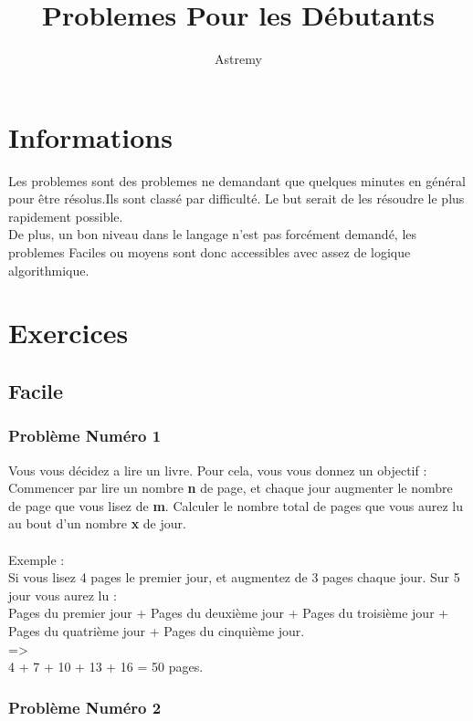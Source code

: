 \documentclass[12pt]{article}
\title{Problemes Pour les Débutants}
\author{Astremy}
\date{}
\begin{document}
\maketitle

\tableofcontents
\newpage


\section{Informations}

Les problemes sont des problemes ne demandant que quelques minutes en général pour être résolus.Ils sont classé par difficulté. Le but serait de les résoudre le plus rapidement possible.\\
De plus, un bon niveau dans le langage n'est pas forcément demandé, les problemes Faciles ou moyens sont donc accessibles avec assez de logique algorithmique.

\section{Exercices}

\subsection{Facile}

\subsubsection{Problème Numéro 1}

Vous vous décidez a lire un livre. Pour cela, vous vous donnez un objectif : Commencer par lire un nombre \textbf{n} de page, et chaque jour augmenter le nombre de page que vous lisez de \textbf{m}. Calculer le nombre total de pages que vous aurez lu au bout d'un nombre \textbf{x} de jour.
\\\\
Exemple :\\
Si vous lisez 4 pages le premier jour, et augmentez de 3 pages chaque jour. Sur 5 jour vous aurez lu :\\
Pages du premier jour + Pages du deuxième jour + Pages du troisième jour + Pages du quatrième jour + Pages du cinquième jour.\\
=\textgreater\\
4 + 7 + 10 + 13 + 16 = 50 pages.

\subsubsection{Problème Numéro 2}
\end{document}

